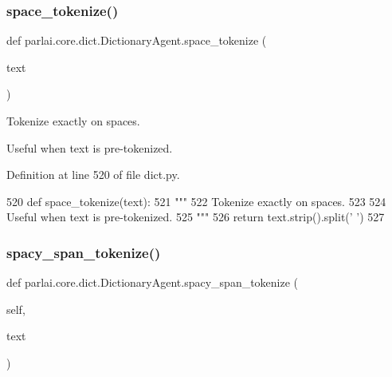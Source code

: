 \subsubsection{\texorpdfstring{space\+\_\+tokenize()}{space\_tokenize()}}
{\footnotesize\ttfamily def parlai.\+core.\+dict.\+Dictionary\+Agent.\+space\+\_\+tokenize (\begin{DoxyParamCaption}\item[{}]{text }\end{DoxyParamCaption})\hspace{0.3cm}{\ttfamily [static]}}

\begin{DoxyVerb}Tokenize exactly on spaces.

Useful when text is pre-tokenized.
\end{DoxyVerb}
 

Definition at line 520 of file dict.\+py.


\begin{DoxyCode}
520     \textcolor{keyword}{def }space\_tokenize(text):
521         \textcolor{stringliteral}{"""}
522 \textcolor{stringliteral}{        Tokenize exactly on spaces.}
523 \textcolor{stringliteral}{}
524 \textcolor{stringliteral}{        Useful when text is pre-tokenized.}
525 \textcolor{stringliteral}{        """}
526         \textcolor{keywordflow}{return} text.strip().split(\textcolor{stringliteral}{' '})
527 
\end{DoxyCode}
\mbox{\label{classparlai_1_1core_1_1dict_1_1DictionaryAgent_a6532e92a69be5a68d04963597cd4ba29}} 
\subsubsection{\texorpdfstring{spacy\+\_\+span\+\_\+tokenize()}{spacy\_span\_tokenize()}}
{\footnotesize\ttfamily def parlai.\+core.\+dict.\+Dictionary\+Agent.\+spacy\+\_\+span\+\_\+tokenize (\begin{DoxyParamCaption}\item[{}]{self,  }\item[{}]{text }\end{DoxyParamCaption})}

